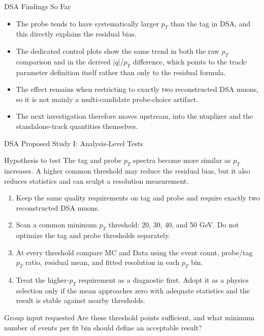 \documentclass[aspectratio=169]{beamer}
\begin{document}
\begin{frame}{DSA Findings So Far}
  \begin{itemize}
    \item The probe tends to have systematically larger $p_{T}$ than the tag in DSA, and this directly explains the residual bias.
    \item The dedicated control plots show the same trend in both the raw $p_{T}$ comparison and in the derived $|q|/p_{T}$ difference, which points to the track-parameter definition itself rather than only to the residual formula.
    \item The effect remains when restricting to exactly two reconstructed DSA muons, so it is not mainly a multi-candidate probe-choice artifact.
    \item The next investigation therefore moves upstream, into the ntuplizer and the standalone-track quantities themselves.
  \end{itemize}
\end{frame}

\begin{frame}{DSA Proposed Study I: Analysis-Level Tests}
  \small
  \begin{block}{Hypothesis to test}
    The tag and probe $p_{T}$ spectra become more similar as $p_{T}$ increases. A higher common threshold may reduce the residual bias, but it also reduces statistics and can sculpt a resolution measurement.
  \end{block}
  \begin{enumerate}
    \item Keep the same quality requirements on tag and probe and require exactly two reconstructed DSA muons.
    \item Scan a common minimum $p_{T}$ threshold: 20, 30, 40, and 50 GeV. Do not optimize the tag and probe thresholds separately.
    \item At every threshold compare MC and Data using the event count, probe/tag $p_{T}$ ratio, residual mean, and fitted resolution in each $p_{T}$ bin.
    \item Treat the higher-$p_{T}$ requirement as a diagnostic first. Adopt it as a physics selection only if the mean approaches zero with adequate statistics and the result is stable against nearby thresholds.
  \end{enumerate}
  \begin{alertblock}{Group input requested}
    Are these threshold points sufficient, and what minimum number of events per fit bin should define an acceptable result?
  \end{alertblock}
\end{frame}
\end{document}
